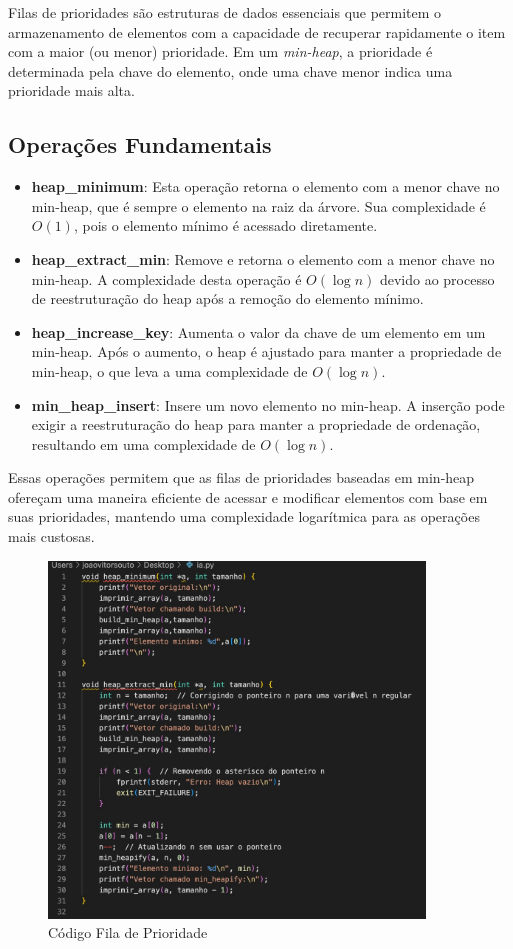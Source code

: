 Filas de prioridades são estruturas de dados essenciais que permitem o armazenamento de elementos com a capacidade de recuperar rapidamente o item com a maior (ou menor) prioridade. Em um \textit{min-heap}, a prioridade é determinada pela chave do elemento, onde uma chave menor indica uma prioridade mais alta.

\subsection*{Operações Fundamentais}

\begin{itemize}
  \item \textbf{heap\_minimum}: Esta operação retorna o elemento com a menor chave no min-heap, que é sempre o elemento na raiz da árvore. Sua complexidade é $O(1)$, pois o elemento mínimo é acessado diretamente.
  
  \item \textbf{heap\_extract\_min}: Remove e retorna o elemento com a menor chave no min-heap. A complexidade desta operação é $O(\log n)$ devido ao processo de reestruturação do heap após a remoção do elemento mínimo.
  
  \item \textbf{heap\_increase\_key}: Aumenta o valor da chave de um elemento em um min-heap. Após o aumento, o heap é ajustado para manter a propriedade de min-heap, o que leva a uma complexidade de $O(\log n)$.
  
  \item \textbf{min\_heap\_insert}: Insere um novo elemento no min-heap. A inserção pode exigir a reestruturação do heap para manter a propriedade de ordenação, resultando em uma complexidade de $O(\log n)$.
\end{itemize}

Essas operações permitem que as filas de prioridades baseadas em min-heap ofereçam uma maneira eficiente de acessar e modificar elementos com base em suas prioridades, mantendo uma complexidade logarítmica para as operações mais custosas.

\begin{figure}[H]
    \centering
    \includegraphics[width = 10cm]{Imagens/fila/98cf0803-8396-443a-a626-22850b4a8a54.jpg}
    \caption{Código Fila de Prioridade}
    \label{grafico_insert}
\end{figure}

